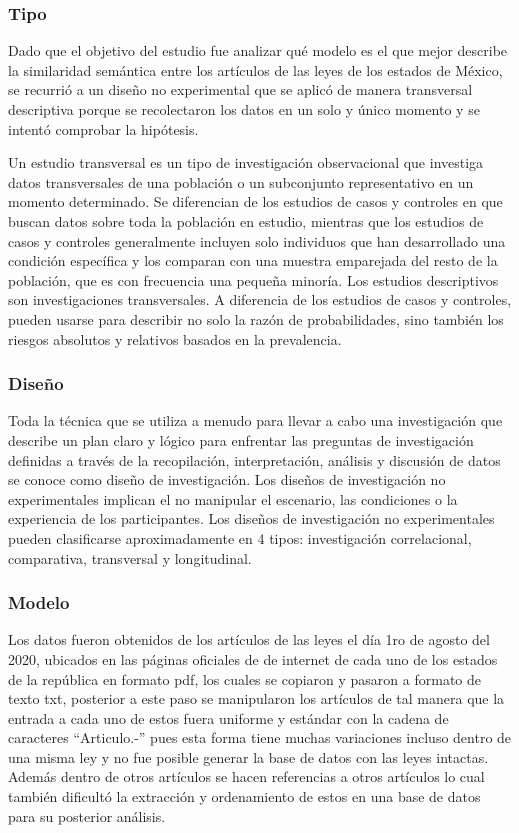 \documentclass[12pt]{article}
\begin{document}
			
			\subsubsection{Tipo}
			Dado que el objetivo del estudio fue analizar qué modelo es el que mejor describe la similaridad semántica entre los artículos de las leyes de los estados de México, se recurrió a un diseño no experimental que se aplicó de manera transversal descriptiva porque se recolectaron los datos en un solo y único momento y se intentó comprobar la hipótesis.
			
			Un estudio transversal es un tipo de investigación observacional que investiga datos transversales de una población o un subconjunto representativo en un momento determinado. Se diferencian de los estudios de casos y controles en que buscan datos sobre toda la población en estudio, mientras que los estudios de casos y controles generalmente incluyen solo individuos que han desarrollado una condición específica y los comparan con una muestra emparejada del resto de la población, que es con frecuencia una pequeña minoría. Los estudios descriptivos son investigaciones transversales. A diferencia de los estudios de casos y controles, pueden usarse para describir no solo la razón de probabilidades, sino también los riesgos absolutos y relativos basados en la prevalencia. \cite{Wang2020}
			
			\subsubsection{Diseño}
			Toda la técnica que se utiliza a menudo para llevar a cabo una investigación que describe un plan claro y lógico para enfrentar las preguntas de investigación definidas a través de la recopilación, interpretación, análisis y discusión de datos se conoce como diseño de investigación. Los diseños de investigación no experimentales implican el no manipular el escenario, las condiciones o la experiencia de los participantes. Los diseños de investigación no experimentales pueden clasificarse aproximadamente en 4 tipos: investigación correlacional, comparativa, transversal y longitudinal. \cite{Kumatongo2021}
			
			\subsubsection{Modelo}
			Los datos fueron obtenidos de los artículos de las leyes el día 1ro de agosto del 2020, ubicados en las páginas oficiales de de internet de cada uno de los estados de la república en formato pdf, los cuales se copiaron y pasaron a formato de texto txt, posterior a este paso se manipularon los artículos de tal manera que la entrada a cada uno de estos fuera uniforme y estándar con la cadena de caracteres ``Articulo.-'' pues esta forma tiene muchas variaciones incluso dentro de una misma ley y no fue posible generar la base de datos con las leyes intactas. Además dentro de otros artículos se hacen referencias a otros artículos lo cual también dificultó la extracción y ordenamiento de estos en una base de datos para su posterior análisis.
			
\end{document}
